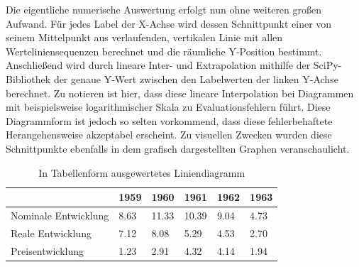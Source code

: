 Die eigentliche numerische Auswertung erfolgt nun ohne weiteren großen Aufwand. Für jedes Label der X-Achse wird dessen Schnittpunkt einer von seinem Mittelpunkt aus verlaufenden, vertikalen Linie mit allen Werteliniensequenzen berechnet und die räumliche Y-Position bestimmt. Anschließend wird durch lineare Inter- und Extrapolation mithilfe der SciPy-Bibliothek \cite{2020SciPy-NMeth} der genaue Y-Wert zwischen den Labelwerten der linken Y-Achse berechnet. Zu notieren ist hier, dass diese lineare Interpolation bei Diagrammen mit beispielsweise logarithmischer Skala zu Evaluationsfehlern führt. Diese Diagrammform ist jedoch so selten vorkommend, dass diese fehlerbehaftete Herangehensweise akzeptabel erscheint. Zu visuellen Zwecken wurden diese Schnittpunkte ebenfalls in dem grafisch dargestellten Graphen veranschaulicht.

\begin{table}[H]
    \centering
    \begin{tabular}{|l|l|l|l|l|l|}
        \hline
        \rowcolor[HTML]{EFEFEF}
                             & 1959 & 1960  & 1961  & 1962 & 1963 \\ \hline
        Nominale Entwicklung & 8.63 & 11.33 & 10.39 & 9.04 & 4.73 \\ \hline
        Reale Entwicklung    & 7.12 & 8.08  & 5.29  & 4.53 & 2.70 \\ \hline
        Preisentwicklung     & 1.23 & 2.91  & 4.32  & 4.14 & 1.94 \\ \hline
    \end{tabular}
    \caption{In Tabellenform ausgewertetes Liniendiagramm}
\end{table}
